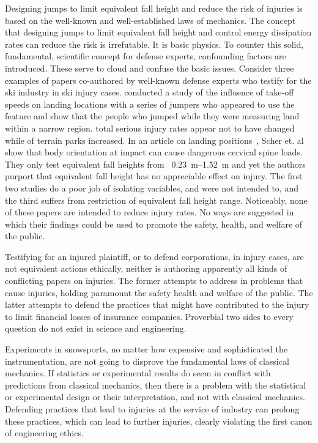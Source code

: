 \documentclass{article}
\begin{document}
Designing jumps to limit equivalent fall height and reduce the risk of injuries
is based on the well-known and well-established laws of mechanics. The concept
that designing jumps to limit equivalent fall height and control energy
dissipation rates can reduce the risk is irrefutable. It is basic physics. To
counter this solid, fundamental, scientific concept for defense experts,
confounding factors are introduced. These serve to cloud and confuse the basic
issues. Consider three examples of papers co-authored by well-known defense
experts who testify for the ski industry in ski injury cases. \cite{Shealy2010}
conducted a study of the influence of take-off speeds on landing locations with
a series of jumpers who appeared to use the feature and show that the people
who jumped while they were measuring land within a narrow region.
\cite{Shealy2015} total serious injury rates appear not to have changed while
of terrain parks increased. In an article on landing
positions~\cite{Scher2015}, Scher et. al show that body orientation at impact
can cause dangerous cervical spine loads. They only test equivalent fall
heights from ~\SIrange{0.23}{1.52}{\meter} and yet the authors purport that
equivalent fall height has no appreciable effect on injury. The first two
studies do a poor job of isolating variables, and were not intended to, and the
third suffers from restriction of equivalent fall height range. Noticeably,
none of these papers are intended to reduce injury rates. No ways are suggested
in which their findings could be used to promote the safety, health, and
welfare of the public.

Testifying for an injured plaintiff, or to defend corporations, in injury
cases, are not equivalent actions ethically, neither is authoring apparently
all kinds of conflicting papers on injuries. The former attempts to address in
problems that cause injuries, holding paramount the safety health and welfare
of the public. The latter attempts to defend the practices that might have
contributed to the injury to limit financial losses of insurance companies.
Proverbial two sides to every question do not exist in science and engineering.

Experiments in snowsports, no matter how expensive and sophisticated the
instrumentation, are not going to disprove the fundamental laws of classical
mechanics. If statistics or experimental results do seem in conflict with
predictions from classical mechanics, then there is a problem with the
statistical or experimental design or their interpretation, and not with
classical mechanics. Defending practices that lead to injuries at the service
of industry can prolong these practices, which can lead to further injuries,
clearly violating the first canon of engineering ethics.
\end{document}
